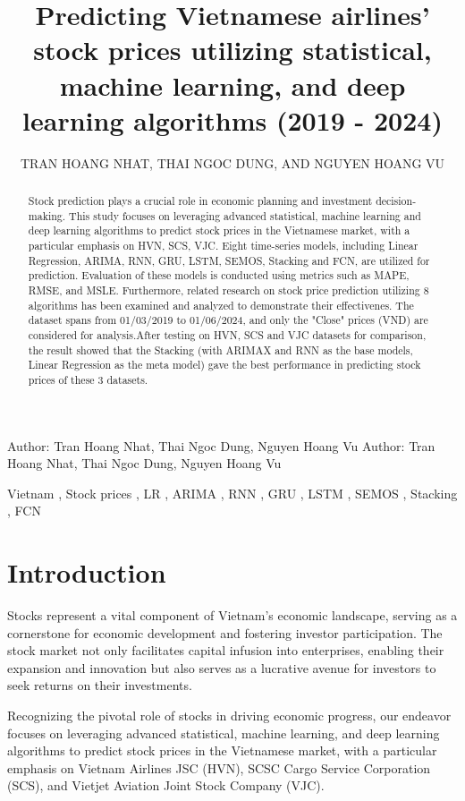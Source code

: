 \documentclass{ieeeojies}
\title{\fontsize{21}{25}\selectfont Predicting Vietnamese airlines' stock prices utilizing statistical, machine learning, and deep learning algorithms (2019 - 2024)}
\author{\uppercase{Tran Hoang Nhat}\authorrefmark{1},
\uppercase{Thai Ngoc Dung\authorrefmark{2}, and Nguyen Hoang Vu}\authorrefmark{3}}
\begin{document}
\markboth
{Author: Tran Hoang Nhat, Thai Ngoc Dung, Nguyen Hoang Vu}
{Author: Tran Hoang Nhat, Thai Ngoc Dung, Nguyen Hoang Vu}

\begin{abstract}

Stock prediction plays a crucial role in economic planning and investment decision-making. This study focuses on leveraging advanced statistical,  machine learning and deep learning algorithms to predict stock prices in the Vietnamese market, with a particular emphasis on HVN, SCS, VJC. Eight time-series models, including Linear Regression, ARIMA,  RNN, GRU, LSTM, SEMOS, Stacking and FCN, are utilized for prediction. Evaluation of these models is conducted using metrics such as MAPE, RMSE, and MSLE. Furthermore, related research on stock price prediction utilizing 8 algorithms has been examined and analyzed to demonstrate their effectivenes. The dataset spans from 01/03/2019 to 01/06/2024, and only the "Close" prices (VND) are considered for analysis.After testing on HVN, SCS and VJC datasets for comparison, the result showed that the Stacking (with ARIMAX and RNN as the base models, Linear Regression as the meta model) gave the best performance in predicting stock prices of these 3 datasets.

\end{abstract}
\begin{keywords}
    Vietnam , Stock prices , LR , ARIMA , RNN , GRU , LSTM , SEMOS , Stacking , FCN
\end{keywords}


\titlepgskip=-30pt

\maketitle

\section{Introduction}
\label{sec:introduction}

Stocks represent a vital component of Vietnam's economic landscape, serving as a cornerstone for economic development and fostering investor participation. The stock market not only facilitates capital infusion into enterprises, enabling their expansion and innovation but also serves as a lucrative avenue for investors to seek returns on their investments.

Recognizing the pivotal role of stocks in driving economic progress, our endeavor focuses on leveraging advanced statistical, machine learning, and deep learning algorithms to predict stock prices in the Vietnamese market, with a particular emphasis on Vietnam Airlines JSC (HVN), SCSC Cargo Service Corporation (SCS), and Vietjet Aviation Joint Stock Company (VJC).
\end{document}
